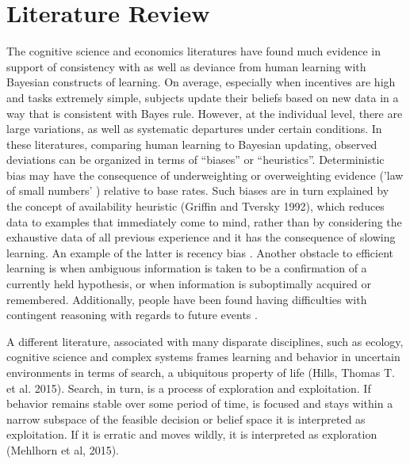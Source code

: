\section{Literature Review}
The cognitive science and economics literatures have found much evidence in support of consistency with as well as deviance from human learning with Bayesian constructs of learning. On average, especially when incentives are high and tasks extremely simple, subjects update their beliefs based on new data in a way that is consistent with Bayes rule. However, at the individual level, there are large variations, as well as systematic departures under certain conditions.  In these literatures, comparing human learning to Bayesian updating, observed deviations can be organized in terms of ``biases'' or ``heuristics''.  Deterministic bias may have the consequence of underweighting or overweighting evidence ('law of small numbers' ) relative to base rates.  Such biases are in turn explained by the concept of availability heuristic (Griffin and Tversky 1992), which reduces data to examples that immediately come to mind, rather than by considering the exhaustive data of all previous experience and it has the consequence of slowing learning.  An example of the latter is recency bias \citep{FudenbergPeysakhovich2014}.  Another obstacle to efficient learning is when ambiguous information is taken to be a confirmation of a currently held hypothesis, or when information is suboptimally acquired or remembered.  Additionally, people have been found having difficulties with contingent reasoning with regards to future events \citep{CharnessLevin2009}. 
 
A different literature, associated with many disparate disciplines, such as ecology, cognitive science and complex systems frames learning and behavior in uncertain environments in terms of search, a ubiquitous property of life (Hills, Thomas T. et al. 2015).  Search, in turn, is a process of exploration and exploitation.  If behavior remains stable over some period of time, is focused and stays within a narrow subspace of the feasible decision or belief space it is interpreted as exploitation.  If it is erratic and moves wildly, it is interpreted as exploration (Mehlhorn et al, 2015).   


